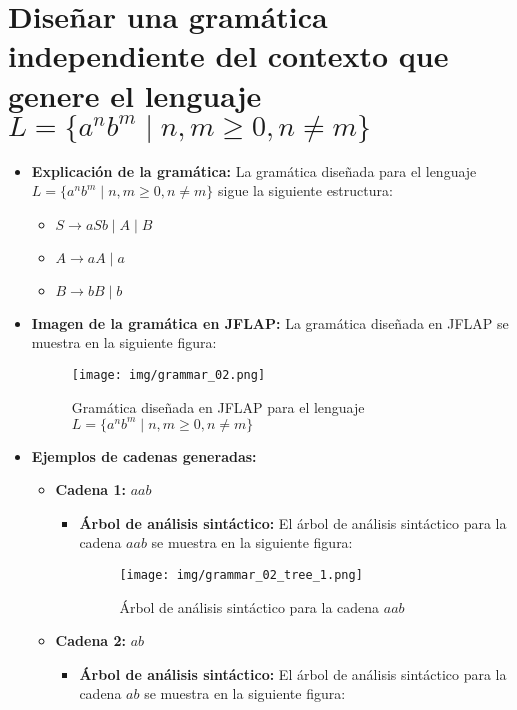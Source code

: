 \documentclass[11pt]{report}
\begin{document}
\section{Diseñar una gramática independiente del contexto que genere el lenguaje \texorpdfstring{$L = \{a^n b^m \mid n, m \geq 0, n \neq m\}$}{L = \{a^n b^m | n, m >= 0, n ≠ m\}}}
\begin{itemize}
  \item \textbf{Explicación de la gramática:} La gramática diseñada para el lenguaje $L = \{a^n b^m \mid n, m \geq 0, n \neq m\}$ sigue la siguiente estructura:
  \begin{itemize}
    \item $S \rightarrow aSb \mid A \mid B$
    \item $A \rightarrow aA \mid a$
    \item $B \rightarrow bB \mid b$
  \end{itemize}
  \item \textbf{Imagen de la gramática en JFLAP:} La gramática diseñada en JFLAP se muestra en la siguiente figura:
  \begin{figure}[H]
    \centering
    \texttt{[image: img/grammar\_02.png]}
    \caption{Gramática diseñada en JFLAP para el lenguaje $L = \{a^n b^m \mid n, m \geq 0, n \neq m\}$}
  \end{figure}
  \item \textbf{Ejemplos de cadenas generadas:}
  \begin{itemize}
    \item \textbf{Cadena 1:} $aab$
    \begin{itemize}
      \item \textbf{Árbol de análisis sintáctico:} El árbol de análisis sintáctico para la cadena $aab$ se muestra en la siguiente figura:
      \begin{figure}[H]
        \centering
        \texttt{[image: img/grammar\_02\_tree\_1.png]}
        \caption{Árbol de análisis sintáctico para la cadena $aab$}
        \label{fig:arbol4}
      \end{figure}
    \end{itemize}
    \item \textbf{Cadena 2:} $ab$
    \begin{itemize}
      \item \textbf{Árbol de análisis sintáctico:} El árbol de análisis sintáctico para la cadena $ab$ se muestra en la siguiente figura:
      \begin{figure}[H]
        \centering

\end{figure}
\end{itemize}
\end{itemize}
\end{itemize}
\end{document}
